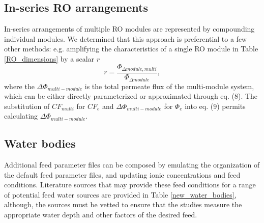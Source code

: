\subsection{In-series RO arrangements}

In-series arrangements of multiple RO modules are represented by compounding individual modules. We determined that this approach is preferential to a few other methods: e.g. amplifying the characteristics of a single RO module in Table \ref{RO_dimensions} by a scalar $r$
\begin{equation}
    r=\frac{\Phi_{\Delta module,multi}}{\Phi_{\Delta module}},
\end{equation}
where the $\Delta \Phi_{multi-module}$ is the total permeate flux of the multi-module system, which can be either directly parameterized or approximated through eq. (8). The substitution of $CF_{multi}$ for $CF_e$ and $\Delta \Phi_{multi-module}$ for $\Phi_e$ into eq. (9) permits calculating $\Delta \Phi_{multi-module}$. 

\subsection{Water bodies}

Additional feed parameter files can be composed by emulating the organization of the default feed parameter files, and updating ionic concentrations and feed conditions. Literature sources that may provide these feed conditions for a range of potential feed water sources are provided in Table \ref{new_water_bodies}, although, the sources must be vetted to ensure that the studies measure the appropriate water depth and other factors of the desired feed. 

